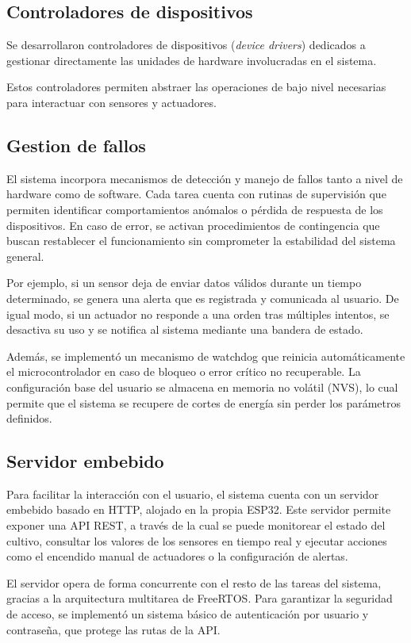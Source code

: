 \subsection{Controladores de dispositivos}

Se desarrollaron controladores de dispositivos (\textit{device drivers}) dedicados a gestionar directamente las unidades de hardware involucradas en el sistema.

Estos controladores permiten abstraer las operaciones de bajo nivel necesarias para interactuar con sensores y actuadores.

\subsection{Gestion de fallos}
El sistema incorpora mecanismos de detección y manejo de fallos tanto a nivel de hardware como de software. Cada tarea cuenta con rutinas de supervisión que permiten identificar comportamientos anómalos o pérdida de respuesta de los dispositivos. En caso de error, se activan procedimientos de contingencia que buscan restablecer el funcionamiento sin comprometer la estabilidad del sistema general.

Por ejemplo, si un sensor deja de enviar datos válidos durante un tiempo determinado, se genera una alerta que es registrada y comunicada al usuario. De igual modo, si un actuador no responde a una orden tras múltiples intentos, se desactiva su uso y se notifica al sistema mediante una bandera de estado.

Además, se implementó un mecanismo de watchdog que reinicia automáticamente el microcontrolador en caso de bloqueo o error crítico no recuperable. La configuración base del usuario se almacena en memoria no volátil (NVS), lo cual permite que el sistema se recupere de cortes de energía sin perder los parámetros definidos.

\subsection{Servidor embebido}
Para facilitar la interacción con el usuario, el sistema cuenta con un servidor embebido basado en HTTP, alojado en la propia ESP32. Este servidor permite exponer una API REST, a través de la cual se puede monitorear el estado del cultivo, consultar los valores de los sensores en tiempo real y ejecutar acciones como el encendido manual de actuadores o la configuración de alertas.

El servidor opera de forma concurrente con el resto de las tareas del sistema, gracias a la arquitectura multitarea de FreeRTOS. Para garantizar la seguridad de acceso, se implementó un sistema básico de autenticación por usuario y contraseña, que protege las rutas de la API.

